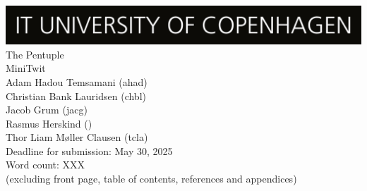 \begin{titlepage}      
    \begin{center}
        \includegraphics[width=\textwidth]{images/ITU_logo.jpg}\\[1.5cm]
      
        \huge {             
            The Pentuple \\ MiniTwit
        }\\
        \vspace{2cm}
        {\Large
            Adam Hadou Temsamani (ahad) 
        }\\
        {\Large
            Christian Bank Lauridsen (chbl)
        }\\
        {\Large
            Jacob Grum (jacg) 
        }\\
        {\Large
            Rasmus Herskind ()  
        }\\
        {\Large
            Thor Liam Møller Clausen (tcla)  
        }\\
        \vspace{2cm}
        {\Large
            Deadline for submission: May 30, 2025
        }\\
        \vspace{2cm} 
        {\large 
            Word count: XXX \\ (excluding front page, table of contents, references and appendices)
        } 
    \end{center} 
\end{titlepage}